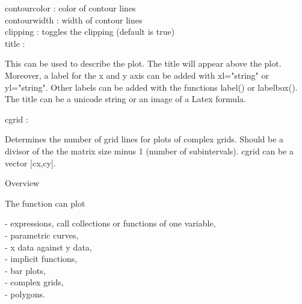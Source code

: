 \documentclass[a4paper,10pt]{article}
\begin{document}
\begin{eulernotebook}
\begin{eulercomment}
\begin{eulercomment}
\begin{eulercomment}
\begin{eulercomment}
\begin{eulercomment}
contourcolor : color of contour lines\\
contourwidth : width of contour lines\\
clipping  : toggles the clipping (default is true)\\
title     :\\
\end{eulercomment}
\begin{eulerttcomment}
  This can be used to describe the plot. The title will appear above
  the plot. Moreover, a label for the x and y axis can be added with
  xl="string" or yl="string". Other labels can be added with the
  functions label() or labelbox(). The title can be a unicode
  string or an image of a Latex formula.
\end{eulerttcomment}
\begin{eulercomment}
cgrid     :\\
\end{eulercomment}
\begin{eulerttcomment}
  Determines the number of grid lines for plots of complex grids.
  Should be a divisor of the the matrix size minus 1 (number of
  subintervals). cgrid can be a vector [cx,cy].
\end{eulerttcomment}
\begin{eulercomment}

Overview

The function can plot

- expressions, call collections or functions of one variable,\\
- parametric curves,\\
- x data against y data,\\
- implicit functions,\\
- bar plots,\\
- complex grids,\\
- polygons.


\end{eulercomment}
\end{eulercomment}
\end{eulercomment}
\end{eulercomment}
\end{eulercomment}
\end{eulernotebook}
\end{document}
